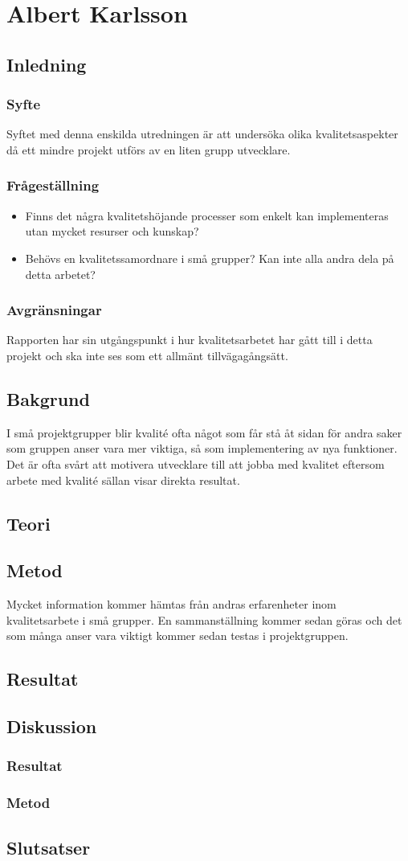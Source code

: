 \section{Albert Karlsson}
\subsection{Inledning}

\subsubsection{Syfte}
Syftet med denna enskilda utredningen är att undersöka olika kvalitetsaspekter då ett mindre projekt utförs av en liten grupp utvecklare.
\subsubsection{Frågeställning}
\begin{itemize}
\item Finns det några kvalitetshöjande processer som enkelt kan implementeras utan mycket resurser och kunskap?
\item Behövs en kvalitetssamordnare i små grupper? Kan inte alla andra dela på detta arbetet?

\end{itemize}
\subsubsection{Avgränsningar}
Rapporten har sin utgångspunkt i hur kvalitetsarbetet har gått till i detta projekt och ska inte ses som ett allmänt tillvägagångsätt. 
\subsection{Bakgrund}
I små projektgrupper blir kvalité ofta något som får stå åt sidan för andra saker som gruppen anser vara mer viktiga, så som implementering av nya funktioner. Det är ofta svårt att motivera utvecklare till att jobba med kvalitet eftersom arbete med kvalité sällan visar direkta resultat. 
\subsection{Teori}
\subsection{Metod}
Mycket information kommer hämtas från andras erfarenheter inom kvalitetsarbete i små grupper. En sammanställning kommer sedan göras och det som många anser vara viktigt kommer sedan testas i projektgruppen.    
\subsection{Resultat}
\subsection{Diskussion}
\subsubsection{Resultat}
\subsubsection{Metod}
\subsection{Slutsatser}

